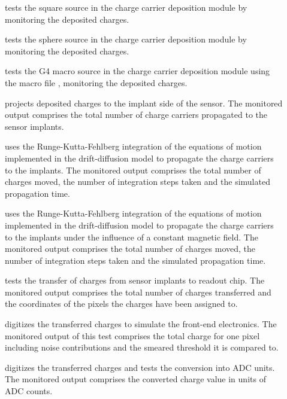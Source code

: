 \begin{description}
    \item[] tests the square source in the charge carrier deposition module by monitoring the deposited charges.
    \item[] tests the sphere source in the charge carrier deposition module by monitoring the deposited charges.
    \item[] tests the G4 macro source in the charge carrier deposition module using the macro file , monitoring the deposited charges.
    \item[] projects deposited charges to the implant side of the sensor. The monitored output comprises the total number of charge carriers propagated to the sensor implants.
    \item[] uses the Runge-Kutta-Fehlberg integration of the equations of motion implemented in the drift-diffusion model to propagate the charge carriers to the implants. The monitored output comprises the total number of charges moved, the number of integration steps taken and the simulated propagation time.
    \item[] uses the Runge-Kutta-Fehlberg integration of the equations of motion implemented in the drift-diffusion model to propagate the charge carriers to the implants under the influence of a constant magnetic field. The monitored output comprises the total number of charges moved, the number of integration steps taken and the simulated propagation time.
    \item[] tests the transfer of charges from sensor implants to readout chip. The monitored output comprises the total number of charges transferred and the coordinates of the pixels the charges have been assigned to.
    \item[] digitizes the transferred charges to simulate the front-end electronics. The monitored output of this test comprises the total charge for one pixel including noise contributions and the smeared threshold it is compared to.
    \item[] digitizes the transferred charges and tests the conversion into ADC units. The monitored output comprises the converted charge value in units of ADC counts.

\end{description}
